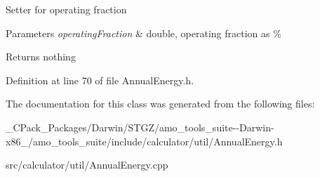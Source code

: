 Setter for operating fraction


\begin{DoxyParams}{Parameters}
{\em operating\+Fraction} & double, operating fraction as \%\\
\hline
\end{DoxyParams}
\begin{DoxyReturn}{Returns}
nothing 
\end{DoxyReturn}


Definition at line 70 of file Annual\+Energy.\+h.



The documentation for this class was generated from the following files\+:\begin{DoxyCompactItemize}
\item 
\+\_\+\+C\+Pack\+\_\+\+Packages/\+Darwin/\+S\+T\+G\+Z/amo\+\_\+tools\+\_\+suite-\/-\/\+Darwin-\/x86\+\_/amo\+\_\+tools\+\_\+suite/include/calculator/util/Annual\+Energy.\+h\item 
src/calculator/util/Annual\+Energy.\+cpp\end{DoxyCompactItemize}
